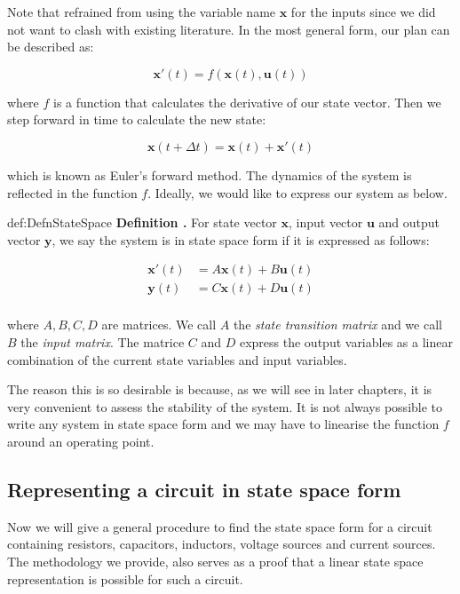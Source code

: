 \documentclass[14pt,a5paper,twoside]{book}
\newenvironment{myDefinition}[2]{ \begin{Definition}[adjusted title=#1]{}{#2} 
  \textbf{Definition \thetcbcounter.} \label{#2}}{\end{Definition}}
\begin{document}
Note that refrained from using the variable name $\mathbf{x}$ for the inputs since we did not want to clash with existing literature. In the most general form, our plan can be described as:

$$
\mathbf{x}'(t) = f(\mathbf{x}(t),\mathbf{u}(t))
$$

where $f$ is a function that calculates the derivative of our state vector. Then we step forward in time to calculate the new state:

$$
\mathbf{x}(t+\Delta t) = \mathbf{x}(t) + \mathbf{x}'(t)
$$

which is known as Euler's forward method. The dynamics of the system is reflected in the function $f$. Ideally, we would like to express our system as below.

\begin{myDefinition}{State Space Representation}{def:DefnStateSpace}
	For state vector $\mathbf{x}$, input vector $\mathbf{u}$ and output vector $\mathbf{y}$, we say the system is in state space form if it is expressed as follows:
	
	\begin{align*}
	\mathbf{x}'(t) &= A \mathbf{x}(t) + B \mathbf{u}(t)\\
	\mathbf{y}(t) &= C \mathbf{x}(t) + D \mathbf{u}(t)\\	
	\end{align*}
	
	where $A,B,C,D$ are matrices. We call $A$ the \emph{state transition matrix} and we call $B$ the \emph{input matrix}. The matrice $C$ and $D$ express the output variables as a linear combination of the current state variables and input variables.
\end{myDefinition}

 The reason this is so desirable is because, as we will see in later chapters, it is very convenient to assess the stability of the system. It is not always possible to write any system in state space form and we may have to linearise the function $f$ around an operating point.


\subsection{Representing a circuit in state space form}
Now we will give a general procedure to find the state space form for a circuit containing resistors, capacitors, inductors, voltage sources and current sources. The methodology we provide, also serves as a proof that a linear state space representation is possible for such a circuit.
\end{document}
